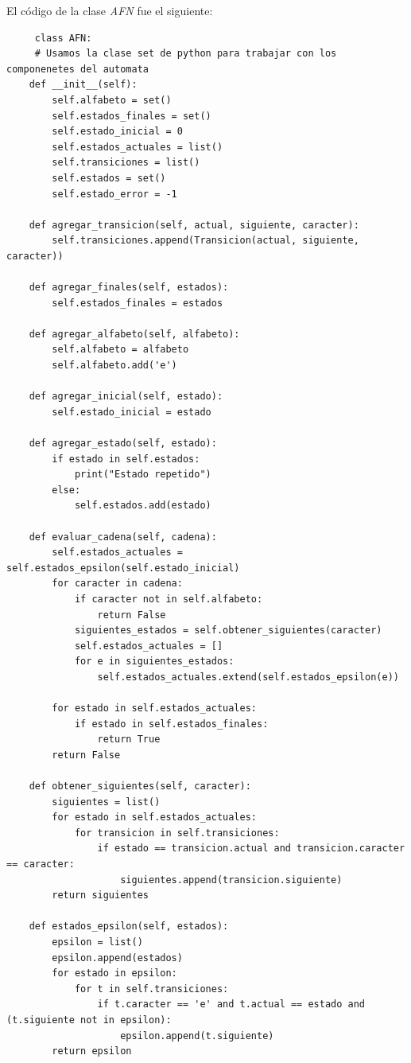 \documentclass[titlepage]{article}
\begin{document}
	El código de la clase \emph{AFN} fue el siguiente:
	\begin{lstlisting}
	 class AFN:
	 # Usamos la clase set de python para trabajar con los componenetes del automata 
    def __init__(self):
        self.alfabeto = set()
        self.estados_finales = set()
        self.estado_inicial = 0
        self.estados_actuales = list()
        self.transiciones = list()
        self.estados = set()
        self.estado_error = -1

    def agregar_transicion(self, actual, siguiente, caracter):
        self.transiciones.append(Transicion(actual, siguiente, caracter))

    def agregar_finales(self, estados):
        self.estados_finales = estados

    def agregar_alfabeto(self, alfabeto):
        self.alfabeto = alfabeto
        self.alfabeto.add('e')

    def agregar_inicial(self, estado):
        self.estado_inicial = estado

    def agregar_estado(self, estado):
        if estado in self.estados:
            print("Estado repetido")
        else:
            self.estados.add(estado)

    def evaluar_cadena(self, cadena):
        self.estados_actuales = self.estados_epsilon(self.estado_inicial)
        for caracter in cadena:
            if caracter not in self.alfabeto:
                return False
            siguientes_estados = self.obtener_siguientes(caracter)
            self.estados_actuales = []
            for e in siguientes_estados:
                self.estados_actuales.extend(self.estados_epsilon(e))

        for estado in self.estados_actuales:
            if estado in self.estados_finales:
                return True
        return False

    def obtener_siguientes(self, caracter):
        siguientes = list()
        for estado in self.estados_actuales:
            for transicion in self.transiciones:
                if estado == transicion.actual and transicion.caracter == caracter:
                    siguientes.append(transicion.siguiente)
        return siguientes

    def estados_epsilon(self, estados):
        epsilon = list()
        epsilon.append(estados)
        for estado in epsilon:
            for t in self.transiciones:
                if t.caracter == 'e' and t.actual == estado and (t.siguiente not in epsilon):
                    epsilon.append(t.siguiente)
        return epsilon
	\end{lstlisting}
	
\end{document}
